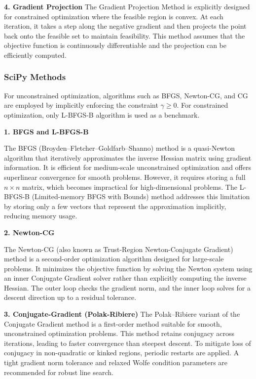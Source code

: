 \documentclass[12pt]{article}
\begin{document}
\textbf{4. Gradient Projection}
The Gradient Projection Method is explicitly designed for constrained optimization where the feasible region is convex. At each iteration, it takes a step along the negative gradient and then projects the point back onto the feasible set to maintain feasibility. This method assumes that the objective function is continuously differentiable and the projection can be efficiently computed.


\subsubsection{SciPy Methods}

For unconstrained optimization, algorithms such as BFGS, Newton-CG, and CG are employed by implicitly enforcing the constraint $\gamma\geq0$. For constrained optimization, only L-BFGS-B algorithm is used as a benchmark. 

\textbf{1. BFGS and L-BFGS-B}

The BFGS (Broyden–Fletcher–Goldfarb–Shanno) method is a quasi-Newton algorithm that iteratively approximates the inverse Hessian matrix using gradient information. It is efficient for medium-scale unconstrained optimization and offers superlinear convergence for smooth problems. However, it requires storing a full \( n \times n \) matrix, which becomes impractical for high-dimensional problems. The L-BFGS-B (Limited-memory BFGS with Bounds) method addresses this limitation by storing only a few vectors that represent the approximation implicitly, reducing memory usage.

\textbf{2. Newton-CG }

The Newton-CG (also known as Trust-Region Newton-Conjugate Gradient) method is a second-order optimization algorithm designed for large-scale problems. It minimizes the objective function by solving the Newton system using an inner Conjugate Gradient solver rather than explicitly computing the inverse Hessian. The outer loop checks the gradient norm, and the inner loop solves for a descent direction up to a residual tolerance. 

\textbf{3. Conjugate-Gradient (Polak-Ribiere)}
The Polak–Ribiere variant of the Conjugate Gradient method is a first-order method suitable for smooth, unconstrained optimization problems. This method retains conjugacy across iterations, leading to faster convergence than steepest descent. To mitigate loss of conjugacy in non-quadratic or kinked regions, periodic restarts are applied. A tight gradient norm tolerance and relaxed Wolfe condition parameters are recommended for robust line search.
\end{document}
